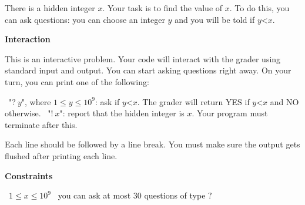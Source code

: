 There is a hidden integer $x$. Your task is to find the value of $x$.
To do this, you can ask questions: you can choose an integer $y$ and you will be told if $y $<$ x$.

\vspace{0.3cm}\noindent\textbf{Interaction}

This is an interactive problem. Your code will interact with the grader using standard input and output. You can start asking questions right away.
On your turn, you can print one of the following:

\textbullet\ "$?\ y$", where $1 \le y \le 10^9$: ask if $y $<$ x$. The grader will return YES if $y $<$ x$ and NO otherwise.
\textbullet\ "$!\ x$": report that the hidden integer is $x$. Your program must terminate after this.

Each line should be followed by a line break. You must make sure the output gets flushed after printing each line.

\vspace{0.3cm}\noindent\textbf{Constraints}

\textbullet\ $1 \le x \le 10^9$
\textbullet\ you can ask at most $30$ questions of type $?$